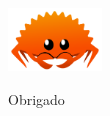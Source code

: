 \documentclass[aspectratio=169]{beamer}
\begin{document}
\begin{frame}[standout]
	\begin{center}
		\includegraphics[width=2.5cm]{imgs/rustacean.png}
	\end{center}
  	Obrigado
  		
\end{frame}
\end{document}

